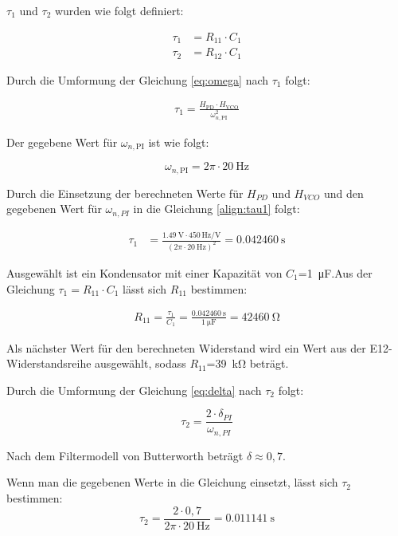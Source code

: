$\tau_1$ und $\tau_2$ wurden wie folgt definiert:

\begin{align}
\tau_1 &= R_{11} \cdot C_1 \\
\tau_2 &= R_{12} \cdot C_1
\end{align}



Durch die Umformung der Gleichung \ref{eq:omega} nach $\tau_1$ folgt:

\begin{align}
\label{align:tau1}
\tau_1=\frac{H_{\text{PD}}\cdot H_{\text{VCO}}}{\omega_{n,\text{PI}}^2}
\end{align}

Der gegebene Wert für $\omega_{n,\text{PI}}$ ist wie folgt:

\begin{equation}
\omega_{n,\text{PI}}=2\pi \cdot \SI{20}{\hertz}
\end{equation}


Durch die Einsetzung der berechneten Werte für $H_{PD}$ und $H_{VCO}$ und den gegebenen Wert für $\omega_{n,PI}$ in die Gleichung \ref{align:tau1} folgt:

\begin{align}
\tau_1 &= \frac{\SI{1.49}{\volt} \cdot 450\, \si{\hertz\per\volt}}{(2\pi \cdot \SI{20}{\hertz})^2}=\SI{0,042460}{\second}
\end{align}



Ausgewählt ist ein Kondensator mit einer Kapazität von $C_1$=\SI{1}{\micro\farad}.Aus der Gleichung $\tau_1= R_{11} \cdot C_1$ lässt sich $R_{11}$ bestimmen:

\begin{align}
R_{11}=\frac{\tau_1}{C_1}=\frac{\SI{0,042460}{\second}}{\SI{1}{\micro\farad}}=\SI{42460}{\ohm}
\end{align}

Als nächster Wert für den berechneten Widerstand wird ein Wert aus der E12-Widerstandsreihe ausgewählt, sodass $R_{11}$=\SI{39}{\kilo\ohm} beträgt. 

Durch die Umformung der Gleichung \ref{eq:delta} nach $\tau_2$ folgt:

\begin{equation}
\tau_2= \frac{ 2 \cdot \delta_{PI}}{\omega_{n,PI}}
\end{equation}


Nach dem Filtermodell von Butterworth beträgt $\delta \approx 0,7$.

Wenn man die gegebenen Werte in die Gleichung einsetzt, lässt sich $\tau_2$ bestimmen:
\begin{equation}
\tau_2= \frac{ 2 \cdot 0,7}{2\pi \cdot \SI{20}{\hertz}}=\SI{0,011141}{\second}
\end{equation}

